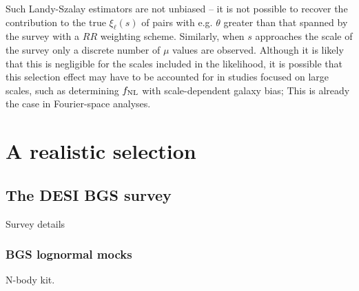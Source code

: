 \documentclass[useAMS,usenatbib]{mn2e}
\begin{document}
Such Landy-Szalay estimators are not unbiased -- it is not possible to recover the contribution to the true $\xi_\ell(s)$ of pairs with e.g. $\theta$ greater than that spanned by the survey with a $RR$ weighting scheme.  Similarly, when $s$ approaches the scale of the survey only a discrete number of $\mu$ values are observed.  Although it is likely that this is negligible for the scales included in the likelihood, it is possible that this selection effect may have to be accounted for in studies focused on large scales, such as determining $f_{\rm{NL}}$ with scale-dependent galaxy bias; This is already the case in Fourier-space analyses.   


\section{A realistic selection}
\subsection{The DESI BGS survey}
Survey details

\subsubsection{BGS lognormal mocks}
N-body kit. 
\end{document}
